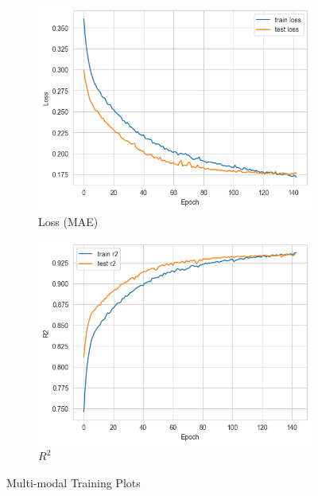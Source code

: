 \begin{figure}[ht]
    \begin{subfigure}[b]{0.48\linewidth}
        \centering
        \includegraphics[width=\linewidth]{images/priceprediction/results/multimodal_loss.png}
        \caption{Loss (MAE)}
        \label{fig:multimodal-loss}
    \end{subfigure}
    \hfill
    \begin{subfigure}[b]{0.48\linewidth}
        \centering
        \includegraphics[width=\linewidth]{images/priceprediction/results/multimodal_r2.png}
        \caption{\(R^2\)}
        \label{fig:multimodal-r2}
    \end{subfigure}
    \caption{Multi-modal Training Plots}
    \label{fig:multimodal-results}
\end{figure}

